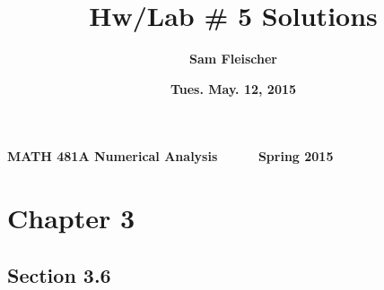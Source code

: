 \documentclass[12pt]{article}
\begin{document}
{\bf MATH 481A \hfill Numerical Analysis \ \ \ \ \ \hfill Spring 2015}

\title{\bf Hw/Lab \# 5 Solutions}
\author{\bf Sam Fleischer}
\date{\bf Tues. May. 12, 2015}

{\let\newpage\relax\maketitle}
\maketitle
\tableofcontents
\pagebreak

\section*{Chapter 3}

\subsection*{Section 3.6}
\end{document}
